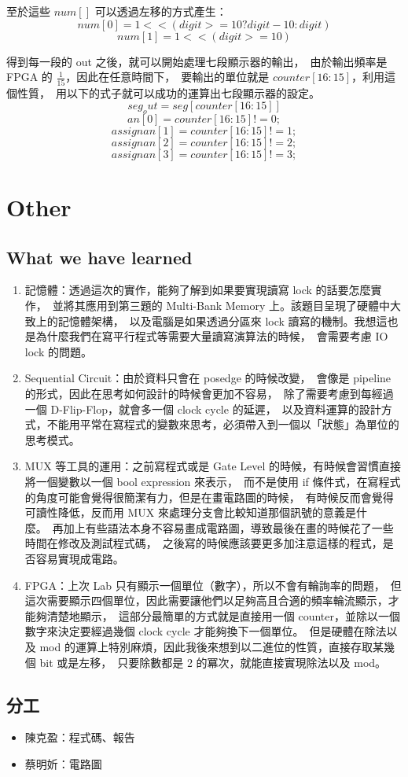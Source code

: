 \documentclass[10.5pt,compsoc,UTF8]{CjC}
\theoremstyle{mystyle}
\begin{document}
至於這些 $num[]$ 可以透過左移的方式產生：
$$num[0] = 1 << (digit >= 10 ? digit - 10 : digit)$$
$$num[1] = 1 << (digit >= 10)$$

得到每一段的 out 之後，就可以開始處理七段顯示器的輸出，\
由於輸出頻率是 FPGA 的 $\frac{1}{15}$，因此在任意時間下，\
要輸出的單位就是 $counter[16:15]$，利用這個性質，\
用以下的式子就可以成功的運算出七段顯示器的設定。
$$seg_out = seg[counter[16:15]]$$
$$an[0] = counter[16:15] != 0;$$
$$assign an[1] = counter[16:15] != 1;$$
$$assign an[2] = counter[16:15] != 2;$$
$$assign an[3] = counter[16:15] != 3;$$

\section{Other}
\subsection*{What we have learned}
\begin{enumerate}
  \item 記憶體：透過這次的實作，能夠了解到如果要實現讀寫 lock 的話要怎麼實作，\
  並將其應用到第三題的 Multi-Bank Memory 上。該題目呈現了硬體中大致上的記憶體架構，\
  以及電腦是如果透過分區來 lock 讀寫的機制。我想這也是為什麼我們在寫平行程式等需要大量讀寫演算法的時候，\
  會需要考慮 IO lock 的問題。
  \item Sequential Circuit：由於資料只會在 posedge 的時候改變，\
  會像是 pipeline 的形式，因此在思考如何設計的時候會更加不容易，\
  除了需要考慮到每經過一個 D-Flip-Flop，就會多一個 clock cycle 的延遲，\
  以及資料運算的設計方式，不能用平常在寫程式的變數來思考，必須帶入到一個以「狀態」為單位的思考模式。
  \item MUX 等工具的運用：之前寫程式或是 Gate Level 的時候，有時候會習慣直接將一個變數以一個 bool expression 來表示，\
  而不是使用 if 條件式，在寫程式的角度可能會覺得很簡潔有力，但是在畫電路圖的時候，\
  有時候反而會覺得可讀性降低，反而用 MUX 來處理分支會比較知道那個訊號的意義是什麼。\
  再加上有些語法本身不容易畫成電路圖，導致最後在畫的時候花了一些時間在修改及測試程式碼，\
  之後寫的時候應該要更多加注意這樣的程式，是否容易實現成電路。
  \item FPGA：上次 Lab 只有顯示一個單位（數字），所以不會有輪詢率的問題，\
  但這次需要顯示四個單位，因此需要讓他們以足夠高且合適的頻率輪流顯示，才能夠清楚地顯示，\
  這部分最簡單的方式就是直接用一個 counter，並除以一個數字來決定要經過幾個 clock cycle 才能夠換下一個單位。\
  但是硬體在除法以及 mod 的運算上特別麻煩，因此我後來想到以二進位的性質，直接存取某幾個 bit 或是左移，\
  只要除數都是 2 的冪次，就能直接實現除法以及 mod。
  
\end{enumerate}

\subsection*{分工}
\begin{itemize}
  \item 陳克盈：程式碼、報告
  \item 蔡明妡：電路圖
\end{itemize}
\end{document}
